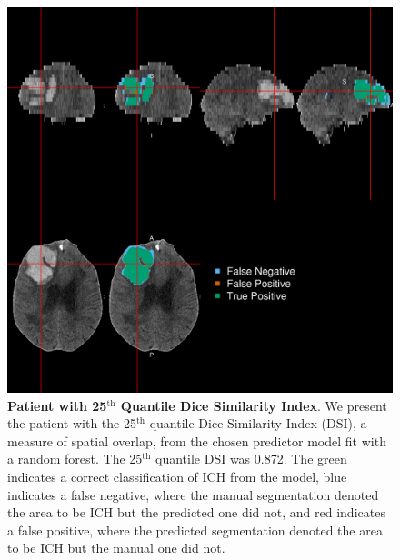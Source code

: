 \documentclass{elsarticle_nonatbib}\usepackage[]{graphicx}\usepackage[]{color}
\begin{document}
 \begin{figure}
\centering
\includegraphics[width=0.75\linewidth,keepaspectratio]{Reseg_Figure_DSI_Quantile_025_native.png}
\caption{{\bf Patient with  25$^{\text{th}}$ Quantile Dice Similarity Index}. We present the patient with the 25$^{\text{th}}$ quantile Dice Similarity Index (DSI), a measure of spatial overlap, from the chosen predictor model fit with a random forest.  The 25$^{\text{th}}$ quantile DSI was 0.872. The green indicates a correct classification of ICH from the model, blue indicates a false negative, where the manual segmentation denoted the area to be ICH but the predicted one did not, and red indicates a false positive, where the predicted segmentation denoted the area to be ICH but the manual one did not. }
\label{fig:dice_img0}
\end{figure}
\end{document}

